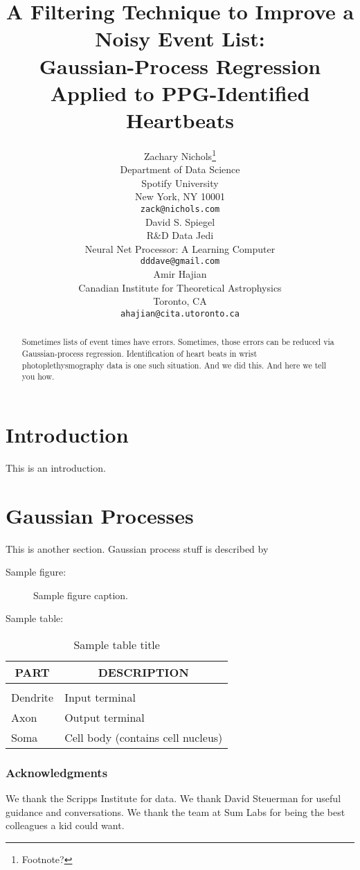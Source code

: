 \documentclass{article} %
\title{A Filtering Technique to Improve a Noisy Event List:\\
Gaussian-Process Regression Applied to PPG-Identified Heartbeats}
\author{
Zachary Nichols\thanks{Footnote?} \\
Department of Data Science\\
Spotify University\\
New York, NY  10001 \\
\texttt{zack@nichols.com} \\
\And
David S. Spiegel \\
R\&D Data Jedi \\
Neural Net Processor: A Learning Computer \\
\texttt{dddave@gmail.com} \\
\AND
Amir Hajian \\
Canadian Institute for Theoretical Astrophysics \\
Toronto, CA \\
\texttt{ahajian@cita.utoronto.ca} \\
}
\begin{document}
\maketitle

\begin{abstract}
Sometimes lists of event times have errors.
Sometimes, those errors can be reduced via Gaussian-process regression.
Identification of heart beats in wrist photoplethysmography data is one such situation.
And we did this.
And here we tell you how.
\end{abstract}

\section{Introduction}
\label{sec:Introduction}

This is an introduction.


\section{Gaussian Processes}
\label{sec:gp}

This is another section.
Gaussian process stuff is described by \cite{rasmussen2006}

Sample figure:
\begin{figure}[h]
\begin{center}
\fbox{\rule[-.5cm]{0cm}{4cm} \rule[-.5cm]{4cm}{0cm}}
\end{center}
\caption{Sample figure caption.}
\end{figure}

Sample table:
\begin{table}[t]
\caption{Sample table title}
\label{sample-table}
\begin{center}
\begin{tabular}{ll}
\multicolumn{1}{c}{\bf PART}  &\multicolumn{1}{c}{\bf DESCRIPTION}
\\ \hline \\
Dendrite         &Input terminal \\
Axon             &Output terminal \\
Soma             &Cell body (contains cell nucleus) \\
\end{tabular}
\end{center}
\end{table}



\subsubsection*{Acknowledgments}

We thank the Scripps Institute for data.
We thank David Steuerman for useful guidance and conversations.
We thank the team at Sum Labs for being the best colleagues a kid could want.



\end{document}
